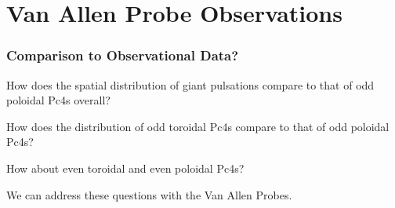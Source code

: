 \documentclass{beamer}
\begin{document}

\section{Van Allen Probe Observations}


\begin{frame}
\frametitle{Comparison to Observational Data?}

\begin{wideitemize}
\item How does the spatial distribution of giant pulsations compare to that of odd poloidal Pc4s overall?
\item How does the distribution of odd toroidal Pc4s compare to that of odd poloidal Pc4s?
\item How about even toroidal and even poloidal Pc4s?
\item We can address these questions with the Van Allen Probes. 
\end{wideitemize}

\end{frame}

\end{document}
